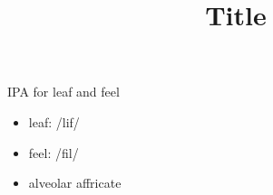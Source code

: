 \documentclass{article}
\author{}
\date{}
\title{Title}
\begin{document}
\maketitle
\tableofcontents
\pagebreak



IPA for leaf and feel
\begin{itemize}
    \item leaf: /lif/
    \item feel: /fil/
    \item alveolar affricate \textdyoghlig 
\end{itemize}
\end{document}
